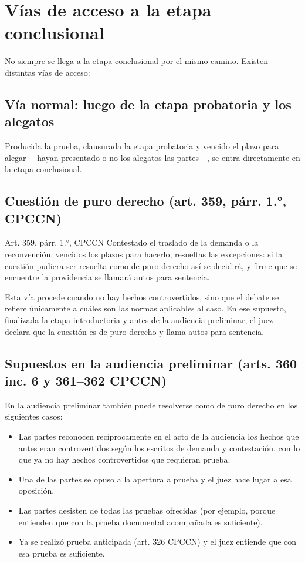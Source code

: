 \documentclass[12pt,oneside]{book}
\begin{document}
\section{Vías de acceso a la etapa conclusional}

No siempre se llega a la etapa conclusional por el mismo camino. Existen distintas vías de acceso:

\subsection{Vía normal: luego de la etapa probatoria y los alegatos}

Producida la prueba, clausurada la etapa probatoria y vencido el plazo para alegar —hayan presentado o no los alegatos las partes—, se entra directamente en la etapa conclusional.

\subsection{Cuestión de puro derecho (art. 359, párr. 1.°, CPCCN)}

\begin{articulo}{Art. 359, párr. 1.°, CPCCN}
Contestado el traslado de la demanda o la reconvención, vencidos los plazos para hacerlo, resueltas las excepciones: si la cuestión pudiera ser resuelta como de puro derecho así se decidirá, y firme que se encuentre la providencia se llamará autos para sentencia.
\end{articulo}

Esta vía procede cuando no hay hechos controvertidos, sino que el debate se refiere únicamente a cuáles son las normas aplicables al caso. En ese supuesto, finalizada la etapa introductoria y antes de la audiencia preliminar, el juez declara que la cuestión es de puro derecho y llama autos para sentencia.

\subsection{Supuestos en la audiencia preliminar (arts. 360 inc. 6 y 361--362 CPCCN)}

En la audiencia preliminar también puede resolverse como de puro derecho en los siguientes casos:

\begin{itemize}
    \item Las partes reconocen recíprocamente en el acto de la audiencia los hechos que antes eran controvertidos según los escritos de demanda y contestación, con lo que ya no hay hechos controvertidos que requieran prueba.
    \item Una de las partes se opuso a la apertura a prueba y el juez hace lugar a esa oposición.
    \item Las partes desisten de todas las pruebas ofrecidas (por ejemplo, porque entienden que con la prueba documental acompañada es suficiente).
    \item Ya se realizó prueba anticipada (art. 326 CPCCN) y el juez entiende que con esa prueba es suficiente.
\end{itemize}
\end{document}
